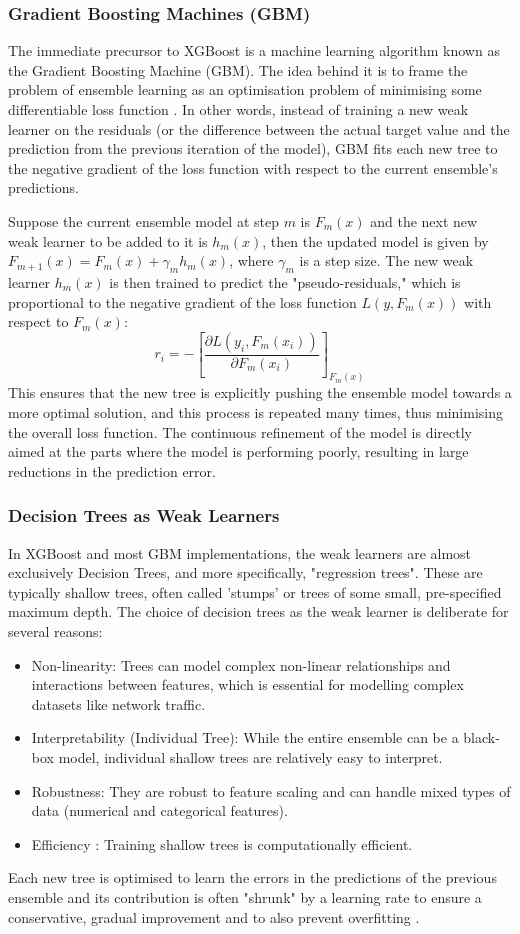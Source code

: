 \subsubsection{Gradient Boosting Machines (GBM)} 
The immediate precursor to XGBoost is a machine learning algorithm known as the Gradient Boosting Machine (GBM). The idea behind it is to frame the problem of ensemble learning as an optimisation problem of minimising some differentiable loss function \parencite{chen2016xgboost}. In other words, instead of training a new weak learner on the residuals (or the difference between the actual target value and the prediction from the previous iteration of the model), GBM fits each new tree to the negative gradient of the loss function with respect to the current ensemble's predictions.

Suppose the current ensemble model at step $m$ is $F_m(x)$ and the next new weak learner to be added to it is $h_m(x)$, then the updated model is given by $F_{m+1}(x) = F_m(x) + \gamma_m h_m(x)$, where $\gamma_m$ is a step size. The new weak learner $h_m(x)$ is then trained to predict the "pseudo-residuals," which is proportional to the negative gradient of the loss function $L(y, F_m(x))$ with respect to $F_m(x)$:
$$ r_i = -\left[\frac{\partial L(y_i, F_m(x_i))}{\partial F_m(x_i)}\right]_{F_m(x)} $$ 
This ensures that the new tree is explicitly pushing the ensemble model towards a more optimal solution, and this process is repeated many times, thus minimising the overall loss function. The continuous refinement of the model is directly aimed at the parts where the model is performing poorly, resulting in large reductions in the prediction error.

\subsubsection{Decision Trees as Weak Learners} 
In XGBoost and most GBM implementations, the weak learners are almost exclusively Decision Trees, and more specifically, "regression trees". These are typically shallow trees, often called 'stumps' or trees of some small, pre-specified maximum depth. The choice of decision trees as the weak learner is deliberate for several reasons:
\begin{itemize}[noitemsep] 
\item Non-linearity: Trees can model complex non-linear relationships and interactions between features, which is essential for modelling complex datasets like network traffic.
\item Interpretability (Individual Tree): While the entire ensemble can be a black-box model, individual shallow trees are relatively easy to interpret.
\item Robustness: They are robust to feature scaling and can handle mixed types of data (numerical and categorical features).
\item Efficiency : Training shallow trees is computationally efficient. 
\end{itemize} 
Each new tree is optimised to learn the errors in the predictions of the previous ensemble and its contribution is often "shrunk" by a learning rate to ensure a conservative, gradual improvement and to also prevent overfitting \parencite{zou2021survey}.

